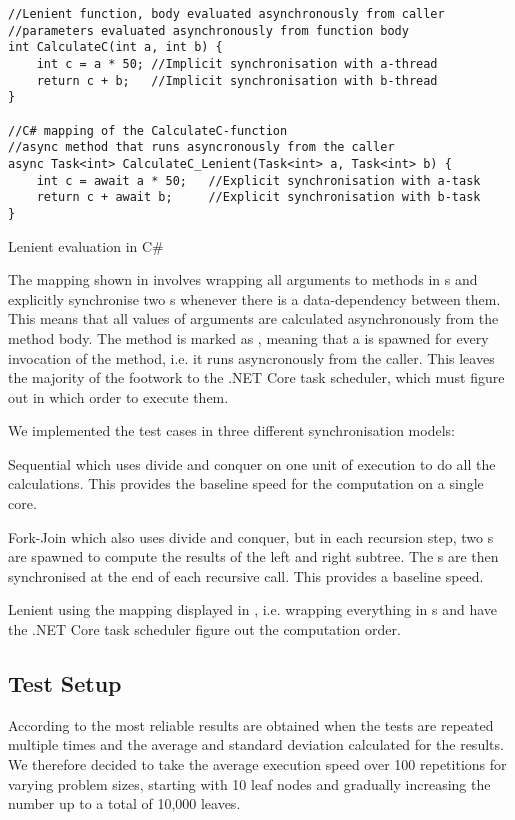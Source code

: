 \begin{listing}[H]
\begin{verbatim}
//Lenient function, body evaluated asynchronously from caller
//parameters evaluated asynchronously from function body
int CalculateC(int a, int b) {
    int c = a * 50; //Implicit synchronisation with a-thread
    return c + b;   //Implicit synchronisation with b-thread
}

//C# mapping of the CalculateC-function
//async method that runs asyncronously from the caller
async Task<int> CalculateC_Lenient(Task<int> a, Task<int> b) {
    int c = await a * 50;   //Explicit synchronisation with a-task
    return c + await b;     //Explicit synchronisation with b-task
}
\end{verbatim}
\caption{Lenient evaluation in C\#} \label{lst:lenient:to:task}
\end{listing}
The mapping shown in  involves wrapping all arguments to methods in s and explicitly synchronise two s whenever there is a data-dependency between them. This means that all values of arguments are calculated asynchronously from the method body. The method is marked as , meaning that a  is spawned for every invocation of the method, i.e. it runs asyncronously from the caller. This leaves the majority of the footwork to the .NET Core task scheduler, which must figure out in which order to execute them.

We implemented the test cases in three different synchronisation models:
\begin{labeling}{\quad\quad}
    \item[Sequential] which uses divide and conquer on one unit of execution to do all the calculations. This provides the baseline speed for the computation on a single core.
    \item[Fork-Join] which also uses divide and conquer, but in each recursion step, two s are spawned to compute the results of the left and right subtree. The s are then synchronised at the end of each recursive call. This provides a \textit{} baseline speed.
    \item[Lenient] using the mapping displayed in , i.e. wrapping everything in s and have the .NET Core task scheduler figure out the computation order.
\end{labeling}

\subsection{Test Setup}
According to \cite{sestoft2013microbenchmarks} the most reliable results are obtained when the tests are repeated multiple times and the average and standard deviation calculated for the results. We therefore decided to take the average execution speed over 100 repetitions for varying problem sizes, starting with 10 leaf nodes and gradually increasing the number up to a total of 10,000 leaves.

